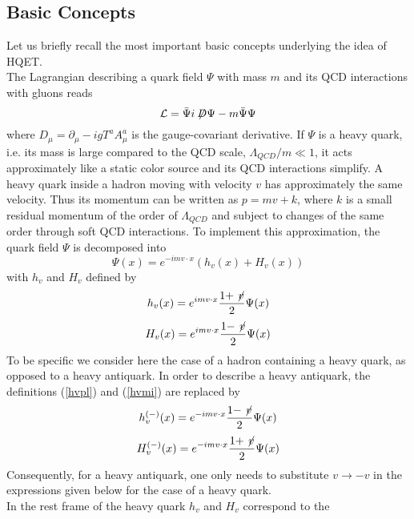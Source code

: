 \subsection{Basic Concepts}
\label{sec:HQET:Basic}

Let us briefly recall the most important basic concepts
underlying the idea of HQET. 
\\
The Lagrangian describing a quark field $\Psi$ with mass $m$ and its QCD
interactions with gluons reads
\begin{equation}\label{lful}
{\cal L}=\bar\Psi i\not\!\! D\Psi-m\bar\Psi\Psi
\end{equation}
where $D_\mu=\partial_\mu-i g T^a A^a_\mu$ is the gauge-covariant
derivative. If $\Psi$ is a heavy quark, i.e. its mass is large compared to
the QCD scale, $\Lambda_{QCD}/m\ll 1$, it acts approximately like a
static color source and its QCD interactions simplify.
A heavy quark inside a hadron moving with velocity $v$ has approximately
the same velocity. Thus its momentum can be written as $p=m v+k$, where $k$
is a small residual momentum of the order of $\Lambda_{QCD}$ and
subject to changes of the same order through soft QCD interactions.
To implement this approximation, the quark field $\Psi$ is decomposed into
\begin{equation}\label{qehv}
\Psi(x)=e^{-i m v\cdot x}\left(h_v(x)+H_v(x)\right)
\end{equation}
with $h_v$ and $H_v$ defined by
\begin{equation}\label{hvpl}
h_v(x)=e^{imv\cdot x}\frac{1+\not\! v}{2} \Psi(x)
\end{equation}
\begin{equation}\label{hvmi}
H_v(x)=e^{imv\cdot x}\frac{1-\not\! v}{2} \Psi(x)
\end{equation}
To be specific we consider here the case of a hadron containing a heavy
quark, as opposed to a heavy antiquark. In order to describe a heavy
antiquark, the definitions (\ref{hvpl}) and (\ref{hvmi}) are replaced by
\begin{equation}\label{ahvp}
h^{(-)}_v(x)=e^{-imv\cdot x}\frac{1-\not\! v}{2} \Psi(x)
\end{equation}
\begin{equation}\label{ahvm}
H^{(-)}_v(x)=e^{-imv\cdot x}\frac{1+\not\! v}{2} \Psi(x)
\end{equation}
Consequently, for a heavy antiquark, one only needs to substitute $v\to -v$ in the  
expressions given below for the case of a heavy quark.
\\
In the rest frame of the heavy quark $h_v$ and $H_v$ correspond to the
